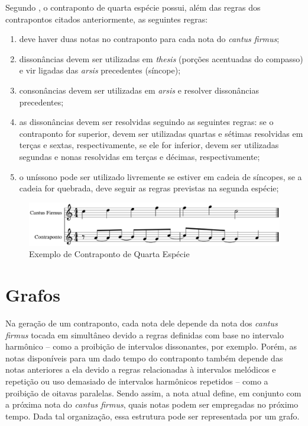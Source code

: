         Segundo , o contraponto de quarta espécie possui, além das regras dos contrapontos citados anteriormente, as seguintes regras:

        \begin{enumerate}
          \item deve haver duas notas no contraponto para cada nota do \textit{cantus firmus};
          \item dissonâncias devem ser utilizadas em \textit{thesis} (porções acentuadas do compasso) e vir ligadas das \textit{arsis} precedentes (síncope);
          \item consonâncias devem ser utilizadas em \textit{arsis} e resolver dissonâncias precedentes;
          \item as dissonâncias devem ser resolvidas seguindo as seguintes regras: se o contraponto for superior, devem ser utilizadas quartas e sétimas resolvidas em terças e sextas, respectivamente, se ele for inferior, devem ser utilizadas segundas e nonas resolvidas em terças e décimas, respectivamente;
          \item o uníssono pode ser utilizado livremente se estiver em cadeia de síncopes, se a cadeia for quebrada, deve seguir as regras previstas na segunda espécie;
        \end{enumerate}

        \begin{figure}[htb]
          \centering
          \includegraphics[scale=0.55]{figuras/contrapontoquarta.eps}
          \caption{Exemplo de Contraponto de Quarta Espécie}
          \label{contrapontoquarta}
        \end{figure}

  \section[Grafos]{Grafos}

    Na geração de um contraponto, cada nota dele depende da nota dos \textit{cantus firmus} tocada em simultâneo devido a regras definidas com base no intervalo harmônico -- como a proibição de intervalos dissonantes, por exemplo. Porém, as notas disponíveis para um dado tempo do contraponto também depende das notas anteriores a ela devido a regras relacionadas à intervalos melódicos e repetição ou uso demasiado de intervalos harmônicos repetidos -- como a proibição de oitavas paralelas. Sendo assim, a nota atual define, em conjunto com a próxima nota do \textit{cantus firmus}, quais notas podem ser empregadas no próximo tempo. Dada tal organização, essa estrutura pode ser representada por um grafo.

